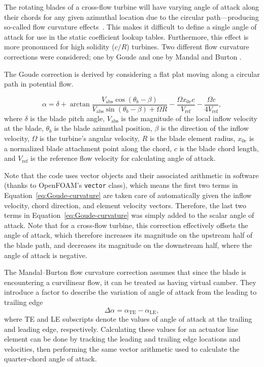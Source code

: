 The rotating blades of a cross-flow turbine will have varying angle of attack
along their chords for any given azimuthal location due to the circular
path---producing so-called flow curvature effects~\cite{Migliore1980}. This
makes it difficult to define a single angle of attack for use in the static
coefficient lookup tables. Furthermore, this effect is more pronounced for high
solidity ($c/R$) turbines. Two different flow curvature corrections were
considered; one by Goude \cite{Goude2012} and one by Mandal and Burton
\cite{Mandal1994}.

The Goude correction is derived by considering a flat plat moving along a
circular path in potential flow.

\begin{equation}
    \alpha = \delta + \arctan \frac{V_\mathrm{abs} \cos(\theta_b -
        \beta)}{V_\mathrm{abs} \sin(\theta_b - \beta) + \Omega R} - \frac{\Omega
        x_{0r}c}{V_\mathrm{ref}} - \frac{\Omega c}{4 V_\mathrm{ref}},
    \label{eq:Goude-curvature}
\end{equation}
where $\delta$ is the blade pitch angle, $V_\mathrm{abs}$ is the magnitude of
the local inflow velocity at the blade, $\theta_b$ is the blade azimuthal
position, $\beta$ is the direction of the inflow velocity, $\Omega$ is the
turbine's angular velocity, $R$ is the blade element radius, $x_{0r}$ is a
normalized blade attachment point along the chord, $c$ is the blade chord
length, and $V_\mathrm{ref}$ is the reference flow velocity for calculating
angle of attack.

Note that the code uses vector objects and their associated arithmetic in
software (thanks to OpenFOAM's \texttt{vector} class), which means the first two
terms in Equation~\ref{eq:Goude-curvature} are taken care of automatically given
the inflow velocity, chord direction, and element velocity vectors. Therefore,
the last two terms in Equation~\ref{eq:Goude-curvature} was simply added to the
scalar angle of attack. Note that for a cross-flow turbine, this correction
effectively offsets the angle of attack, which therefore increases its magnitude
on the upstream half of the blade path, and decreases its magnitude on the
downstream half, where the angle of attack is negative.

The Mandal--Burton flow curvature correction assumes that since the blade is
encountering a curvilinear flow, it can be treated as having virtual camber.
They introduce a factor to describe the variation of angle of attack from the
leading to trailing edge
\begin{equation}
    \Delta \alpha = \alpha_\mathrm{TE} - \alpha_\mathrm{LE},
    \label{eq:Mandal-Burton-alpha-diff}
\end{equation}
where TE and LE subscripts denote the values of angle of attack at the trailing
and leading edge, respectively. Calculating these values for an actuator line
element can be done by tracking the leading and trailing edge locations and
velocities, then performing the same vector arithmetic used to calculate the
quarter-chord angle of attack.

